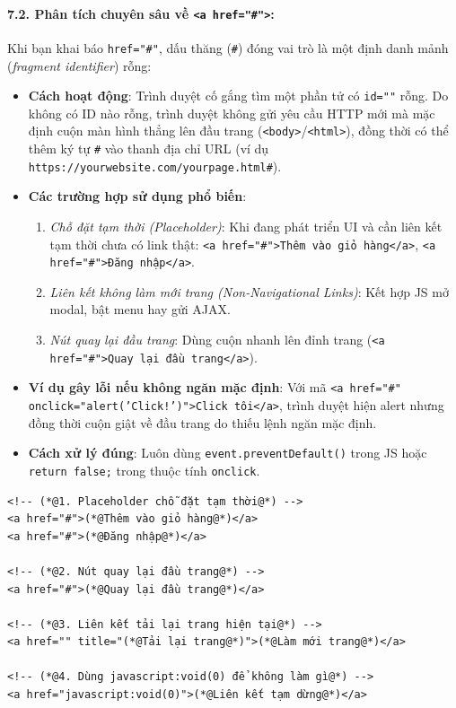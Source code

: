 \documentclass[11pt,oneside]{book}
\newcommand{\codeinline}[1]{\textcolor{accentOrange}{\texttt{#1}}}
\begin{document}
\paragraph{7.2. Phân tích chuyên sâu về \codeinline{<a href="\#">}:}
Khi bạn khai báo \codeinline{href="\#"}, dấu thăng (\codeinline{\#}) đóng vai trò là một định danh mảnh (\textit{fragment identifier}) rỗng:
\begin{itemize}[leftmargin=1.5em, itemsep=3pt, parsep=0pt]
    \item \textbf{Cách hoạt động}: Trình duyệt cố gắng tìm một phần tử có \codeinline{id=""} rỗng. Do không có ID nào rỗng, trình duyệt không gửi yêu cầu HTTP mới mà mặc định cuộn màn hình thẳng lên đầu trang (\codeinline{<body>}/\codeinline{<html>}), đồng thời có thể thêm ký tự \codeinline{\#} vào thanh địa chỉ URL (ví dụ \codeinline{https://yourwebsite.com/yourpage.html\#}).
    \item \textbf{Các trường hợp sử dụng phổ biến}: 
    \begin{enumerate}[leftmargin=1.2em, itemsep=2pt, parsep=0pt]
        \item \textit{Chỗ đặt tạm thời (Placeholder)}: Khi đang phát triển UI và cần liên kết tạm thời chưa có link thật: \codeinline{<a href="\#">Thêm vào giỏ hàng</a>}, \codeinline{<a href="\#">Đăng nhập</a>}.
        \item \textit{Liên kết không làm mới trang (Non-Navigational Links)}: Kết hợp JS mở modal, bật menu hay gửi AJAX.
        \item \textit{Nút quay lại đầu trang}: Dùng cuộn nhanh lên đỉnh trang (\codeinline{<a href="\#">Quay lại đầu trang</a>}).
    \end{enumerate}
    \item \textbf{Ví dụ gây lỗi nếu không ngăn mặc định}: Với mã \codeinline{<a href="\#" onclick="alert('Click!')">Click tôi</a>}, trình duyệt hiện alert nhưng đồng thời cuộn giật về đầu trang do thiếu lệnh ngăn mặc định.
    \item \textbf{Cách xử lý đúng}: Luôn dùng \codeinline{event.preventDefault()} trong JS hoặc \codeinline{return false;} trong thuộc tính \codeinline{onclick}.
\end{itemize}

\begin{codeWindow}
\begin{lstlisting}[language=HTML5]
<!-- (*@1. Placeholder chỗ đặt tạm thời@*) -->
<a href="#">(*@Thêm vào giỏ hàng@*)</a>
<a href="#">(*@Đăng nhập@*)</a>

<!-- (*@2. Nút quay lại đầu trang@*) -->
<a href="#">(*@Quay lại đầu trang@*)</a>

<!-- (*@3. Liên kết tải lại trang hiện tại@*) -->
<a href="" title="(*@Tải lại trang@*)">(*@Làm mới trang@*)</a>

<!-- (*@4. Dùng javascript:void(0) để không làm gì@*) -->
<a href="javascript:void(0)">(*@Liên kết tạm dừng@*)</a>
\end{lstlisting}
\end{codeWindow}
\end{document}

